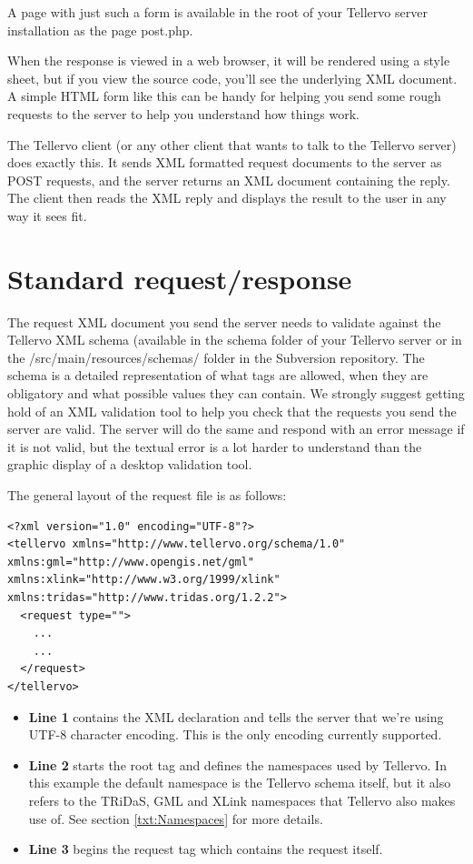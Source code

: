 A page with just such a form is available in the root of your Tellervo server installation as the page post.php.

When the response is viewed in a web browser, it will be rendered using a style sheet, but if you view the source code, you'll see the underlying XML document.  A simple HTML form like this can be handy for helping you send some rough requests to the server to help you understand how things work.

The Tellervo client (or any other client that wants to talk to the Tellervo server) does exactly this.  It sends XML formatted request documents to the server as POST requests, and the server returns an XML document containing the reply.  The client then reads the XML reply and displays the result to the user in any way it sees fit.


\section{Standard request/response}

The request XML document you send the server needs to validate against the Tellervo XML schema (available in the schema folder of your Tellervo server or in the /src/main/resources/schemas/ folder in the Subversion repository.  The schema is a detailed representation of what tags are allowed, when they are obligatory and what possible values they can contain.  We strongly suggest getting hold of an XML validation tool to help you check that the requests you send the server are valid.  The server will do the same and respond with an error message if it is not valid, but the textual error is a lot harder to understand than the graphic display of a desktop validation tool.

The general layout of the request file is as follows:

\begin{lstlisting}
<?xml version="1.0" encoding="UTF-8"?>
<tellervo xmlns="http://www.tellervo.org/schema/1.0" xmlns:gml="http://www.opengis.net/gml" xmlns:xlink="http://www.w3.org/1999/xlink" xmlns:tridas="http://www.tridas.org/1.2.2">
  <request type="">
    ...
    ...
  </request>
</tellervo>
\end{lstlisting}


\begin{itemize}
 \item \textbf{Line 1} contains the XML declaration and tells the server that we're using UTF-8 character encoding.  This is the only encoding currently supported.
 \item \textbf{Line 2} starts the root tag and defines the namespaces used by Tellervo.  In this example the default namespace is the Tellervo schema itself, but it also refers to the TRiDaS, GML and XLink namespaces that Tellervo also makes use of. See section \ref{txt:Namespaces} for more details.
 \item \textbf{Line 3} begins the request tag which contains the request itself. 
\end{itemize}

